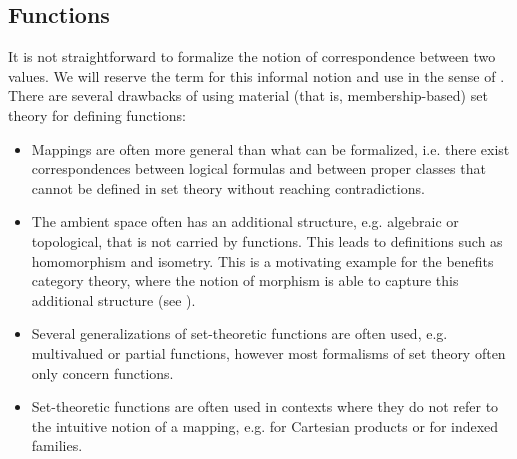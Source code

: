 \subsection{Functions}\label{subsec:functions}

\begin{remark}\label{remark:function_definition}
  It is not straightforward to formalize the notion of correspondence between two values. We will reserve the term  for this informal notion and use  in the sense of . There are several drawbacks of using material (that is, membership-based) set theory for defining functions:

  \begin{itemize}
    \item Mappings are often more general than what can be formalized, i.e. there exist correspondences between logical formulas and between proper classes that cannot be defined in set theory without reaching contradictions.

    \item The ambient space often has an additional structure, e.g. algebraic or topological, that is not carried by functions. This leads to definitions such as homomorphism and isometry. This is a motivating example for the benefits category theory, where the notion of morphism is able to capture this additional structure (see ).

    \item Several generalizations of set-theoretic functions are often used, e.g. multivalued or partial functions, however most formalisms of set theory often only concern functions.

    \item Set-theoretic functions are often used in contexts where they do not refer to the intuitive notion of a mapping, e.g. for Cartesian products or for indexed families.
  \end{itemize}
\end{remark}

